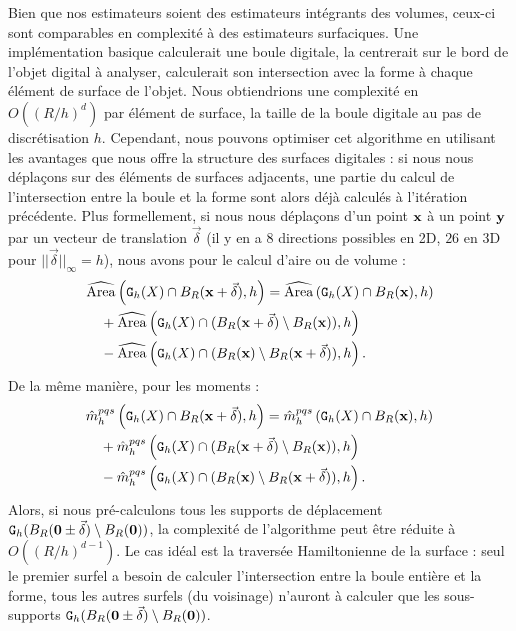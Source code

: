Bien que nos estimateurs soient des estimateurs intégrants des volumes, ceux-ci
sont comparables en complexité à des estimateurs surfaciques. Une implémentation
basique calculerait une boule digitale, la centrerait sur le bord de l'objet
digital à analyser, calculerait son intersection avec la forme à chaque élément
de surface de l'objet. Nous obtiendrions une complexité en $O((R/h)^{d})$ par
élément de surface, \cad la taille de la boule digitale au pas de
discrétisation $h$. Cependant, nous pouvons optimiser cet algorithme en
utilisant les avantages que nous offre la structure des surfaces digitales :
si nous nous déplaçons sur des éléments de surfaces adjacents, une partie du
calcul de l'intersection entre la boule et la forme sont alors déjà calculés à
l'itération précédente. Plus formellement, si nous nous déplaçons d'un point
$\vx$ à un point $\vy$ par un vecteur de translation $\vec{\delta}$ (il y en a
$8$ directions possibles en 2D, $26$ en 3D pour $||\vec{\delta}||_\infty = h$),
nous avons pour le calcul d'aire ou de volume :
%
\begin{align}
  & \AreaC\left(\DSh \cap \Ball{R}{\vx + \vec{\delta}}, h\right) =
  \AreaC\left(\DSh \cap \Ball{R}{\vx}, h\right) \\
  &\quad + \AreaC\left(\DSh \cap (\Ball{R}{\vx + \vec{\delta}} \setminus \Ball{R}{\vx} ), h\right) \\
  &\quad - \AreaC\left(\DSh \cap ( \Ball{R}{\vx} \setminus \Ball{R}{\vx + \vec{\delta}}),h\right) .
\end{align}
%
De la même manière, pour les moments :
%
\begin{align}
  & \DMom{pqs}{h}\left(\DSh \cap \Ball{R}{\vx + \vec{\delta}}, h\right) =
  \DMom{pqs}{h}\left(\DSh \cap \Ball{R}{\vx}, h\right) \\
  &\quad + \DMom{pqs}{h}\left(\DSh \cap ( \Ball{R}{\vx+ \vec{\delta}} \setminus \Ball{R}{\vx} ), h\right)\\
  &\quad - \DMom{pqs}{h}\left(\DSh \cap ( \Ball{R}{\vx} \setminus \Ball{R}{\vx+ \vec{\delta}} ), h\right) .
\end{align}
%
Alors, si nous pré-calculons tous les supports de déplacement
$\DigF{\Ball{R}{\mathbf{0} \pm \vec{\delta}} \setminus
\Ball{R}{\mathbf{0}}}{h}$, la complexité de l'algorithme peut être réduite à
$O((R/h)^{d-1})$. Le cas idéal est la traversée Hamiltonienne de la surface :
seul le premier surfel a besoin de calculer l'intersection entre la boule
entière et la forme, tous les autres surfels (du voisinage) n'auront à calculer
que les sous-supports $\DigF{\Ball{R}{\mathbf{0} \pm \vec{\delta}} \setminus
\Ball{R}{\mathbf{0}}}{h}$.


